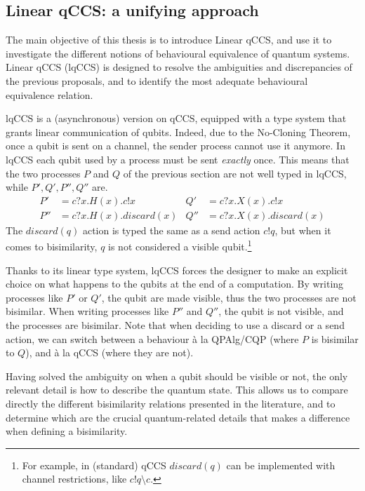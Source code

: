 \subsection*{Linear qCCS: a unifying approach}
The main objective of this thesis is to introduce Linear qCCS, and use it to investigate the different notions of behavioural equivalence of quantum systems. Linear qCCS (lqCCS) is designed to resolve the ambiguities and discrepancies of the previous proposals, and to identify the most adequate behavioural equivalence relation.

lqCCS is a (asynchronous) version on qCCS, equipped with a type system that grants linear communication of qubits. Indeed, due to the No-Cloning Theorem, once a qubit is sent on a channel, the sender process cannot use it anymore. In lqCCS each qubit used by a process must be sent \textit{exactly} once. This means that the two processes $P$ and $Q$ of the previous section are not well typed in lqCCS, while $P', Q', P'', Q''$ are.
\begin{align*}
P' &= c?x.H(x).c!x &  Q' &= c?x.X(x).c!x \\
P'' &= c?x.H(x).discard(x) &  Q'' &= c?x.X(x).discard(x)
\end{align*}
The $discard(q)$ action is typed the same as a send action $c!q$, but when it comes to bisimilarity, $q$ is not considered a visible qubit.\footnote{For example, in (standard) qCCS $discard(q)$ can be implemented with channel restrictions, like $c!q\setminus c$.}

Thanks to its linear type system, lqCCS forces the designer to make an explicit choice on what happens to the qubits at the end of a computation. By writing processes like $P'$ or $Q'$, the qubit are made visible, thus the two processes are not bisimilar. When writing processes like $P''$ and $Q''$, the qubit is not visible, and the processes are bisimilar. Note that when deciding to use a discard or a send action, we can switch between a behaviour à la QPAlg/CQP (where $P$ is bisimilar to $Q$), and à la qCCS (where they are not).

Having solved the ambiguity on when a qubit should be visible or not, the only relevant detail is how to describe the quantum state. This allows us to compare directly the different bisimilarity relations presented in the literature, and to determine which are the crucial  quantum-related details that makes a difference when defining a bisimilarity.  

